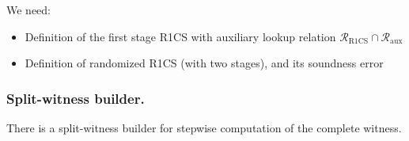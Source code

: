 
We need:
\begin{itemize}
    \item 
    Definition of the first stage R1CS with auxiliary lookup relation $\mathscr R_\text{R1CS} \cap \mathscr R_\text{aux}$
    \item
    Definition of randomized R1CS (with two stages), and its soundness error
\end{itemize}

\subsubsection{Split-witness builder.}
There is a split-witness builder for stepwise computation of the complete witness.
